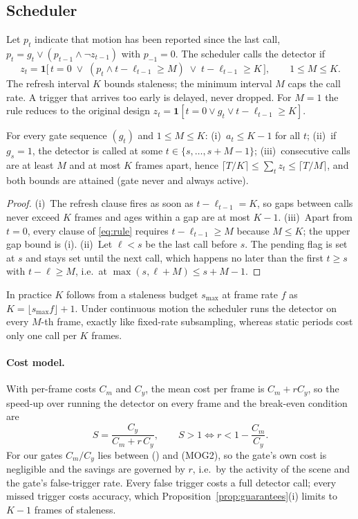 \subsection{Scheduler}\label{sec:scheduler}
Let $p_t$ indicate that motion has been reported since the last call, $p_t=g_t\lor(p_{t-1}\land\lnot z_{t-1})$ with $p_{-1}=0$. The scheduler calls the detector if
\begin{equation}\label{eq:rule}
z_t=\mathbf{1}\bigl[\,t=0\;\lor\;(p_t\land t-\ell_{t-1}\ge M)\;\lor\;t-\ell_{t-1}\ge K\,\bigr],\qquad 1\le M\le K .
\end{equation}
The refresh interval $K$ bounds staleness; the minimum interval $M$ caps the call rate. A trigger that arrives too early is delayed, never dropped. For $M=1$ the rule reduces to the original design $z_t=\mathbf{1}[t=0\lor g_t\lor t-\ell_{t-1}\ge K]$.

\begin{proposition}\label{prop:guarantees}
For every gate sequence $(g_t)$ and $1\le M\le K$:
(i)~$a_t\le K-1$ for all $t$;
(ii)~if $g_s=1$, the detector is called at some $t\in\{s,\dots,s+M-1\}$;
(iii)~consecutive calls are at least $M$ and at most $K$ frames apart, hence $\lceil T/K\rceil\le\sum_t z_t\le\lceil T/M\rceil$, and both bounds are attained (gate never and always active).
\end{proposition}
\begin{proof}
(i)~The refresh clause fires as soon as $t-\ell_{t-1}=K$, so gaps between calls never exceed $K$ frames and ages within a gap are at most $K-1$. (iii)~Apart from $t=0$, every clause of \eqref{eq:rule} requires $t-\ell_{t-1}\ge M$ because $M\le K$; the upper gap bound is (i). (ii)~Let $\ell<s$ be the last call before $s$. The pending flag is set at $s$ and stays set until the next call, which happens no later than the first $t\ge s$ with $t-\ell\ge M$, i.e.\ at $\max(s,\ell+M)\le s+M-1$.
\end{proof}

\noindent In practice $K$ follows from a staleness budget $s_{\max}$ at frame rate $f$ as $K=\lfloor s_{\max}f\rfloor+1$. Under continuous motion the scheduler runs the detector on every $M$-th frame, exactly like fixed-rate subsampling, whereas static periods cost only one call per $K$ frames.

\paragraph{Cost model.} With per-frame costs $C_m$ and $C_y$, the mean cost per frame is $C_m+rC_y$, so the speed-up over running the detector on every frame and the break-even condition are
\begin{equation}\label{eq:cost}
S=\frac{C_y}{C_m+r\,C_y},\qquad S>1\iff r<1-\frac{C_m}{C_y}.
\end{equation}
For our gates $C_m/C_y$ lies between \CostRatioFD{} (\FD) and \CostRatioMOG{} (MOG2), so the gate's own cost is negligible and the savings are governed by $r$, i.e.\ by the activity of the scene and the gate's false-trigger rate. Every false trigger costs a full detector call; every missed trigger costs accuracy, which Proposition~\ref{prop:guarantees}(i) limits to $K-1$ frames of staleness.

